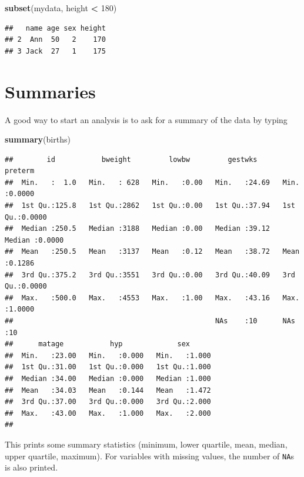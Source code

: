 \documentclass[
]{book}
\newenvironment{Shaded}{\begin{snugshade}}{\end{snugshade}}
\newcommand{\DecValTok}[1]{\textcolor[rgb]{0.00,0.00,0.81}{#1}}
\newcommand{\FunctionTok}[1]{\textcolor[rgb]{0.13,0.29,0.53}{\textbf{#1}}}
\newcommand{\NormalTok}[1]{#1}
\newcommand{\SpecialCharTok}[1]{\textcolor[rgb]{0.81,0.36,0.00}{\textbf{#1}}}
\begin{document}
\begin{Shaded}
\begin{Highlighting}[]
\FunctionTok{subset}\NormalTok{(mydata, height }\SpecialCharTok{\textless{}} \DecValTok{180}\NormalTok{)}
\end{Highlighting}
\end{Shaded}

\begin{verbatim}
##   name age sex height
## 2  Ann  50   2    170
## 3 Jack  27   1    175
\end{verbatim}

\section{Summaries}\label{summaries}

A good way to start an analysis is to ask for a
summary of the data by typing

\begin{Shaded}
\begin{Highlighting}[]
\FunctionTok{summary}\NormalTok{(births)}
\end{Highlighting}
\end{Shaded}

\begin{verbatim}
##        id           bweight         lowbw         gestwks         preterm      
##  Min.   :  1.0   Min.   : 628   Min.   :0.00   Min.   :24.69   Min.   :0.0000  
##  1st Qu.:125.8   1st Qu.:2862   1st Qu.:0.00   1st Qu.:37.94   1st Qu.:0.0000  
##  Median :250.5   Median :3188   Median :0.00   Median :39.12   Median :0.0000  
##  Mean   :250.5   Mean   :3137   Mean   :0.12   Mean   :38.72   Mean   :0.1286  
##  3rd Qu.:375.2   3rd Qu.:3551   3rd Qu.:0.00   3rd Qu.:40.09   3rd Qu.:0.0000  
##  Max.   :500.0   Max.   :4553   Max.   :1.00   Max.   :43.16   Max.   :1.0000  
##                                                NAs    :10      NAs    :10      
##      matage           hyp             sex       
##  Min.   :23.00   Min.   :0.000   Min.   :1.000  
##  1st Qu.:31.00   1st Qu.:0.000   1st Qu.:1.000  
##  Median :34.00   Median :0.000   Median :1.000  
##  Mean   :34.03   Mean   :0.144   Mean   :1.472  
##  3rd Qu.:37.00   3rd Qu.:0.000   3rd Qu.:2.000  
##  Max.   :43.00   Max.   :1.000   Max.   :2.000  
## 
\end{verbatim}

This prints some summary statistics (minimum, lower quartile, mean, median,
upper quartile, maximum). For variables with missing values, the number
of \texttt{NA}s is also printed.
\end{document}
